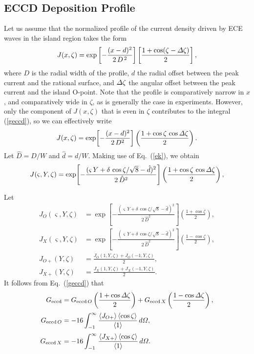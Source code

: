 \documentclass[12pt,prb,aps]{revtex4-1}
\begin{document}
 \subsection{ECCD Deposition Profile}
 Let us assume that the normalized profile of the current density driven by ECE waves in the island region takes the form
 \begin{equation}
 J(x,\zeta) = \exp\left[-\frac{(x-d)^2}{2\,D^{\,2}}\right]\left[\frac{1+\cos(\zeta-{\mit\Delta}\zeta)}{2}\right],
 \end{equation}
 where $D$ is the radial width of the profile, $d$  the radial offset between the peak current and the rational surface, and
${\mit\Delta}\zeta$ the angular offset between the peak current and the island O-point. Note that the profile is  comparatively narrow in $x$, and comparatively
wide in $\zeta$, as is  generally the case in experiments. However, only the component of $J(x,\zeta)$ that is even in $\zeta$ contributes to the integral (\ref{geccd}), so we can effectively write
\begin{equation}
J(x,\zeta)= \exp\!\left[-\frac{(x-d)^2}{2\,D^2}\right]\left(\frac{1+\cos\zeta\,\cos{\mit\Delta}\zeta}{2}\right).
\end{equation}
Let $\hat{D}=D/W$ and $\hat{d}=d/W$. Making use of Eq.~(\ref{ek}), we obtain 
\begin{equation}
J(\varsigma,Y,\zeta) =  \exp\!\left[-\frac{(\varsigma\,Y+\delta\,\cos\zeta/\sqrt{8}-\hat{d})^2}{2\,\hat{D}^2}\right]\left(\frac{1+\cos\zeta\,\cos{\mit\Delta}\zeta}{2}\right),
\end{equation}

Let 
\begin{align}
J_O(\varsigma,Y,\zeta) &=  \exp\!\left[-\frac{(\varsigma\,Y+\delta\,\cos\zeta/\sqrt{8}-\hat{d})^2}{2\,\hat{D}^2}\right]\left(\frac{1+\cos\zeta}{2}\right),\\[0.5ex]
J_X(\varsigma,Y,\zeta) &=  \exp\!\left[-\frac{(\varsigma\,Y+\delta\,\cos\zeta/\sqrt{8}-\hat{d})^2}{2\,\hat{D}^2}\right]\left(\frac{1-\cos\zeta}{2}\right),\\[0.5ex]
J_{O+}(Y,\zeta) &= \frac{J_O(1,Y,\zeta) + J_O(-1,Y,\zeta)}{2},\\[0.5ex]
J_{X+}(Y,\zeta) &= \frac{J_X(1,Y,\zeta) + J_X(-1,Y,\zeta)}{2}.
\end{align}
It follows from Eq.~(\ref{geccd}) that
\begin{align}
G_{\rm eccd}& = G_{{\rm eccd}\,O}\left(\frac{1+\cos{\mit\Delta}\zeta}{2}\right)+G_{{\rm eccd}\,X}\left(\frac{1-\cos{\mit\Delta}\zeta}{2}\right),\\[0.5ex]
G_{{\rm eccd}\,O} &= - 16\int_{-1}^\infty \frac{\langle J_{O+}\rangle\,\langle \cos\zeta\rangle}{\langle 1\rangle}\,d{\mit\Omega},\\[0.5ex]
G_{{\rm eccd}\,X} &= - 16\int_{-1}^\infty \frac{\langle J_{X+}\rangle\,\langle \cos\zeta\rangle}{\langle 1\rangle}\,d{\mit\Omega}.
\end{align}
\end{document}

